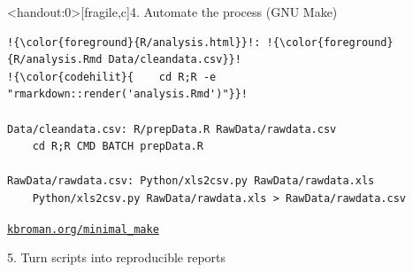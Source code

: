 \documentclass[12pt,t]{beamer}
\begin{document}
\begin{frame}<handout:0>[fragile,c]{4. Automate the process (GNU Make)}

\addtocounter{framenumber}{-1}

\vspace{15mm}

\begin{center}
\begin{minipage}[c]{10.8cm}
\begin{semiverbatim}
\begin{lstlisting}[escapechar=!,linewidth=10.8cm]
!{\color{foreground}{R/analysis.html}}!: !{\color{foreground}{R/analysis.Rmd Data/cleandata.csv}}!
!{\color{codehilit}{    cd R;R -e "rmarkdown::render('analysis.Rmd')"}}!

Data/cleandata.csv: R/prepData.R RawData/rawdata.csv
    cd R;R CMD BATCH prepData.R

RawData/rawdata.csv: Python/xls2csv.py RawData/rawdata.xls
    Python/xls2csv.py RawData/rawdata.xls > RawData/rawdata.csv
\end{lstlisting}
\end{semiverbatim}
\end{minipage}
\end{center}

\vspace{15mm}

\hfill
{\footnotesize \lolit
\href{http://kbroman.org/minimal_make}{\tt kbroman.org/minimal\_make}
}

\end{frame}





\begin{frame}[c]{5. Turn scripts into reproducible reports}


\vspace*{8mm}


\end{frame}
\end{document}
